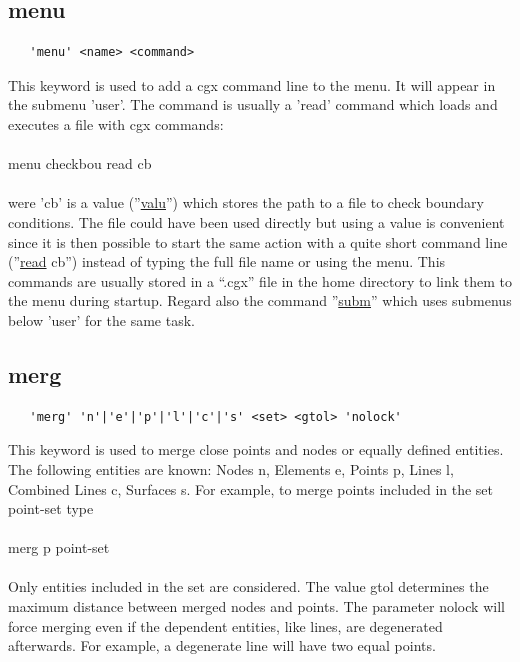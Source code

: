 \documentclass{article}
\providecommand{\htmlref}[2]{\hyperref[#2]{#1}}
\begin{document}
\subsection{\label{menu}menu}
\begin{verbatim}
   'menu' <name> <command>
\end{verbatim}
This keyword is used to add a cgx command line to the menu. It will appear in the submenu 'user'. The command is usually a 'read' command which loads and executes a file with cgx commands:\\\\menu checkbou read cb\\\\were 'cb' is a value (''\htmlref{valu}{valu}'') which stores the path to a file to check boundary conditions. The file could have been used directly but using a value is convenient since it is then possible to start the same action with a quite short command line (''\htmlref{read}{read} cb'') instead of typing the full file name or using the menu. This commands are usually stored in a ``.cgx'' file in the home directory to link them to the menu during startup. Regard also the command ''\htmlref{subm}{subm}'' which uses submenus below 'user' for the same task. 
 
\subsection{\label{merg}merg}
\begin{verbatim}
   'merg' 'n'|'e'|'p'|'l'|'c'|'s' <set> <gtol> 'nolock' 
\end{verbatim}
This keyword is used to merge close points and nodes or equally defined entities. The following entities are known: Nodes n, Elements e, Points p, Lines l, Combined Lines c, Surfaces s. For example, to merge points included in the set point-set type\\\\merg p point-set\\\\Only entities included in the set are considered. The value gtol determines the maximum distance between merged nodes and points. The parameter nolock will force merging even if the dependent entities, like lines, are degenerated afterwards. For example, a degenerate line will have two equal points.
 
\end{document}
